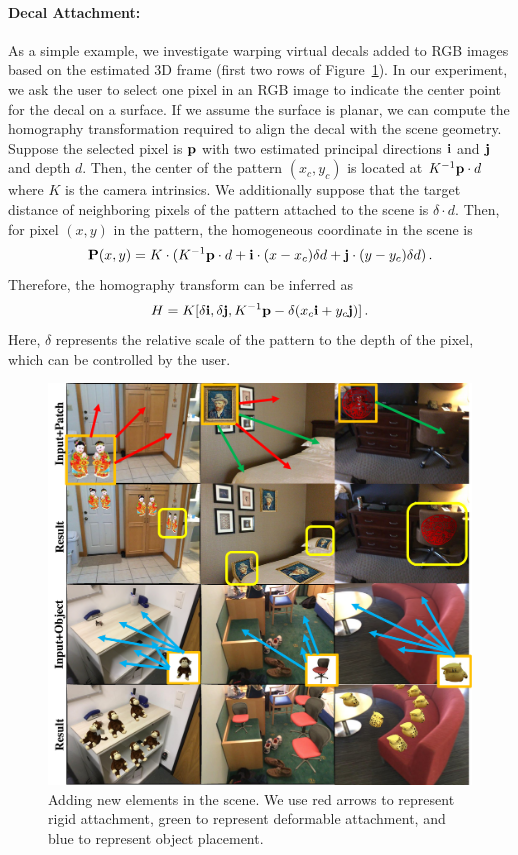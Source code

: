 \paragraph{Decal Attachment:}  As a simple example, we investigate warping virtual decals added to RGB images based on the estimated 3D frame (first two rows of Figure~\ref{fig:framenet-attach}). In our experiment, we ask the user to select one pixel in an RGB image to indicate the center point for the decal on a surface.  If we assume the surface is planar, we can compute the homography transformation required to align the decal with the scene geometry. Suppose the selected pixel is $\mathbf{p}$ with two estimated principal directions $\mathbf{i}$ and $\mathbf{j}$ and depth $d$. Then, the center of the pattern $(x_c,y_c)$ is located at $K^{-1}\mathbf{p}\cdot d$ where $K$ is the camera intrinsics. We additionally suppose that the target distance of neighboring pixels of the pattern attached to the scene is $\delta\cdot d$. Then, for pixel $(x,y)$ in the pattern, the homogeneous coordinate in the scene is
\begin{equation}
\textbf{P}(x,y) = K\cdot(K^{-1}\mathbf{p}\cdot d + \textbf{i}\cdot (x-x_c)\delta d + \textbf{j}\cdot (y-y_c)\delta d)\,.
\end{equation}
Therefore, the homography transform can be inferred as
\begin{equation}
    H=K[\delta \mathbf{i}, \delta \mathbf{j}, K^{-1}\mathbf{p} - \delta(x_c\mathbf{i}+y_c\mathbf{j})]\,.
\end{equation}
Here, $\delta$ represents the relative scale of the pattern to the depth of the pixel, which can be controlled by the user.
\begin{figure}
    \centering
    \includegraphics[width=\linewidth]{FrameNet/graph/attach.pdf}
    \caption{Adding new elements in the scene. We  use red arrows to represent rigid attachment, green to represent deformable attachment, and blue to represent object placement.}
    \label{fig:framenet-attach}
    \vspace{-0.15in}
\end{figure}
